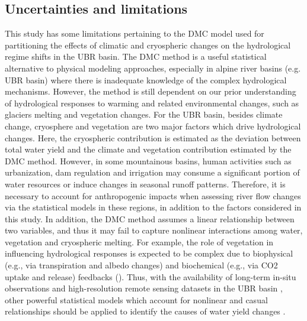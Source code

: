 \documentclass[hess, manuscript]{copernicus}
\begin{document}
\subsection{Uncertainties and limitations}
This study has some limitations pertaining to the DMC model used for partitioning the effects of climatic and cryospheric changes on the hydrological regime shifts in the UBR basin. The DMC method is a useful statistical alternative to physical modeling approaches, especially in alpine river basins (e.g. UBR basin) where there is inadequate knowledge of the complex hydrological mechanisms. However, the method is still dependent on our prior understanding of hydrological responses to warming and related environmental changes, such as glaciers melting and vegetation changes. For the UBR basin, besides climate change, cryosphere \citep{biemans2019importance,yao2019recent} and vegetation \citep{li2021vegetation,li2019greening} are two major factors which drive hydrological changes. Here, the cryospheric contribution is estimated as the deviation between total water yield and the climate and vegetation contribution estimated by the DMC method. However, in some mountainous basins, human activities such as urbanization, dam regulation and irrigation may consume a significant portion of water resources or induce changes in seasonal runoff patterns. Therefore, it is necessary to account for anthropogenic impacts when assessing river flow changes via the statistical models in these regions, in addition to the factors considered in this study. In addition, the DMC method assumes a linear relationship between two variables, and thus it may fail to capture nonlinear interactions among water, vegetation and cryospheric melting. For example, the role of vegetation in influencing hydrological responses is expected to be complex due to biophysical (e.g., via transpiration and albedo changes) and biochemical (e.g., via CO2 uptake and release) feedbacks (\citealt{bonan2008forests,krich2022decoupling,li2021vegetation}). Thus, with the availability of long-term in-situ observations and high-resolution remote sensing datasets in the UBR basin \citep{wang2022observing}, other powerful statistical models which account for nonlinear and casual relationships should be applied to identify the causes of water yield changes \citep{runge2019inferring}.
\end{document}

